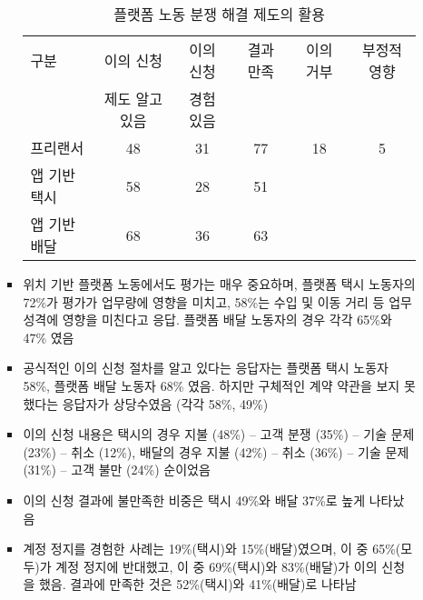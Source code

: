 \begin{itemize}
\begin{itemize}
\begin{itemize}
			\begin{table}[htp]
			\begin{center}
			\begin{threeparttable}
			\caption{플랫폼 노동 분쟁 해결 제도의 활용}\label{tab:appealmechanism}
			\begin{tabularx}{\textwidth}{lccccc}
			\toprule
			 구분 & 이의 신청 & 이의 신청 & 결과 만족 & 이의 거부 & 부정적 영향\\
			 &  제도 알고 있음 & 경험 있음 & & & \\
			\midrule
			프리랜서 & 48 & 31 & 77 & 18 & 5 \\
			\bottomrule
			앱 기반 택시 & 58 & 28 & 51 & & \\
			앱 기반 배달 & 68 & 36 & 63 &  & \\
			\bottomrule
			\end{tabularx}
			\begin{tablenotes}
			\small
			\item 단위: \%
			\end{tablenotes}
			\end{threeparttable}
			\end{center}
			\end{table}%
		\item 위치 기반 플랫폼 노동에서도 평가는 매우 중요하며, 플랫폼 택시 노동자의 72\%가 평가가 업무량에 영향을 미치고, 58\%는 수입 및 이동 거리 등 업무 성격에 영향을 미친다고 응답. 플랫폼 배달 노동자의 경우 각각 65\%와 47\% 였음
		\item 공식적인 이의 신청 절차를 알고 있다는 응답자는 플랫폼 택시 노동자 58\%, 플랫폼 배달 노동자 68\% 였음. 하지만 구체적인 계약 약관을 보지 못했다는 응답자가 상당수였음 (각각 58\%, 49\%)
		\item 이의 신청 내용은 택시의 경우 지불 (48\%) -- 고객 분쟁 (35\%) -- 기술 문제 (23\%) -- 취소 (12\%), 배달의 경우 지불 (42\%) -- 취소 (36\%) -- 기술 문제 (31\%) -- 고객 불만 (24\%) 순이었음
		\item 이의 신청 결과에 불만족한 비중은 택시 49\%와 배달 37\%로 높게 나타났음
		\item 계정 정지를 경험한 사례는 19\%(택시)와 15\%(배달)였으며, 이 중 65\%(모두)가 계정 정지에 반대했고, 이 중 69\%(택시)와 83\%(배달)가 이의 신청을 했음. 결과에 만족한 것은 52\%(택시)와 41\%(배달)로 나타남
		\end{itemize} 
	\end{itemize}
\end{itemize}	
	
	
	
